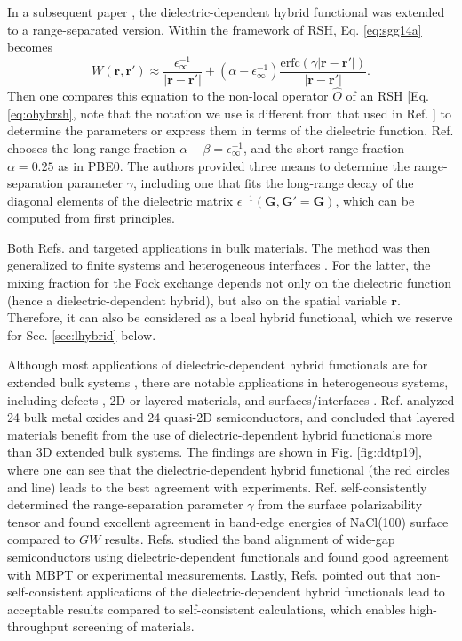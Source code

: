 \documentclass[aip, amsmath, amssymb, reprint, longbibliography]{revtex4-2}
\def\mr{\mathbf{r}}
\begin{document}
In a subsequent paper \cite{SGG16}, the dielectric-dependent hybrid functional was extended to a range-separated version. Within the framework of RSH, Eq. \eqref{eq:sgg14a} becomes
\begin{equation}
W(\mr,\mr')\approx \frac{\epsilon_\infty^{-1}}{|\mr-\mr'|}+(\alpha-\epsilon_\infty^{-1})\frac{\mbox{erfc}(\gamma|\mr-\mr'|)}{|\mr-\mr'|}.
\end{equation}
Then one compares this equation to the non-local operator $\hat{O}$ of an RSH [Eq. \eqref{eq:ohybrsh}, note that the notation we use is different from that used in Ref. ] to determine the parameters or express them in terms of the dielectric function. Ref.  chooses the long-range fraction $\alpha+\beta=\epsilon_{\infty}^{-1}$, and the short-range fraction $\alpha=0.25$ as in PBE0. The authors provided three means to determine the range-separation parameter $\gamma$, including one that fits the long-range decay of the diagonal elements of the dielectric matrix $\epsilon^{-1}(\mathbf{G},\mathbf{G}'=\mathbf{G})$, which can be computed from first principles\cite{WGG08}.

Both Refs.  and  targeted applications in bulk materials. The method was then generalized to finite systems \cite{BVGG16} and heterogeneous interfaces \cite{ZGG19}. For the latter, the mixing fraction for the Fock exchange depends not only on the dielectric function (hence a dielectric-dependent hybrid), but also on the spatial variable $\mr$. Therefore, it can also be considered as a local hybrid functional, which we reserve for Sec. \ref{sec:lhybrid} below.

Although most applications of dielectric-dependent hybrid functionals are for extended bulk systems \cite{GBCO15a,GBDO18,CMRP18,BWCP19,JPSC20,LFMK20,SGMP20}, there are notable applications in heterogeneous systems, including defects \cite{GBCO15b}, 2D or layered materials, \cite{DDTP19,HB20} and surfaces/interfaces \cite{HB18,HKTO17,HGO19,NHLJ22}. Ref.  analyzed 24 bulk metal oxides and 24 quasi-2D semiconductors, and concluded that layered materials benefit from the use of dielectric-dependent hybrid functionals more than 3D extended bulk systems. The findings are shown in Fig. \ref{fig:ddtp19}, where one can see that the dielectric-dependent hybrid functional (the red circles and line) leads to the best agreement with experiments. Ref.  self-consistently determined the range-separation parameter $\gamma$ from the surface polarizability tensor and found excellent agreement in band-edge energies of NaCl(100) surface compared to $GW$ results. Refs.  studied the band alignment of wide-gap semiconductors using dielectric-dependent functionals and found good agreement with MBPT or experimental measurements. Lastly, Refs.  pointed out that non-self-consistent applications of the dielectric-dependent hybrid functionals lead to acceptable results compared to self-consistent calculations, which enables high-throughput screening of materials.
\end{document}
